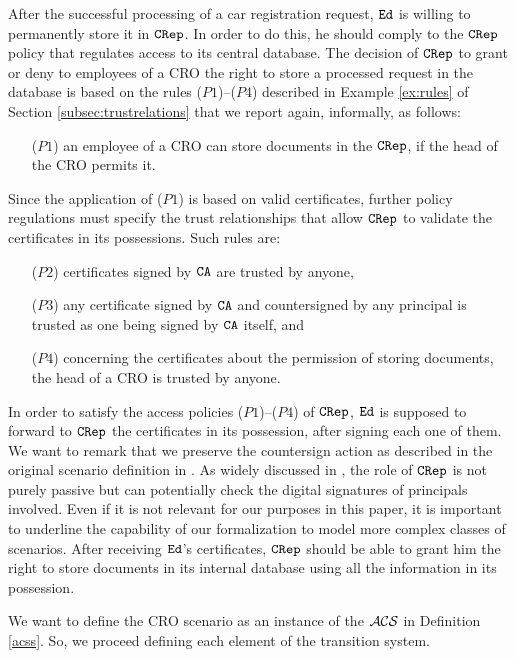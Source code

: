 \documentclass[conference]{llncs}
\newcommand{\theCA}{\ensuremath \mathtt{CA}}
\newcommand{\Ed}{\ensuremath \mathtt{Ed}}
\newcommand{\CRep}{\ensuremath \mathtt{CRep}}
\newcommand{\CRO}{CRO}
\newcommand{\acs}{\ensuremath \mathcal{ACS}}
\begin{document}
{After the successful processing of a car registration request, $\Ed$ is
willing to permanently store it in $\CRep$. In order to do this, he
should comply to the $\CRep$ policy that regulates access to its central
database. The decision of $\CRep$ to grant or deny to employees of a
\CRO{} the right to store a processed request in the database is based
on the rules ($P1$)--($P4$) described in Example \ref{ex:rules} of Section \ref{subsec:trustrelations} 
that we report again, informally, as follows: 
\begin{enumerate}
\item[($P1$)] an employee of a \CRO{} can store documents in the $\CRep$,
if the head of the \CRO{} permits it.
\end{enumerate}
Since the application of ($P1$) is based on valid certificates, further
policy regulations must specify the trust relationships that allow
$\CRep$ to validate the certificates in its possessions. Such rules are:
\begin{enumerate}
\item[($P2$)] certificates signed by $\theCA$ are trusted by anyone, 
\item[($P3$)] any certificate signed by $\theCA$ and countersigned by any
principal is trusted as one being signed by $\theCA$ itself, and 
\item[($P4$)] concerning the certificates about the permission of storing
documents, the head of a \CRO{} is trusted by anyone.
\end{enumerate}

In order to satisfy the access policies ($P1$)--($P4$) of $\CRep$, $\Ed$ is
supposed to forward to $\CRep$ the certificates 
in its possession, after signing each one of them. We want to remark that we preserve the countersign action
as described in the original scenario definition in \cite{avantssar}. As widely discussed in \cite{BRV-TR09},
the role of $\CRep$ is not purely passive but can potentially check the digital signatures of principals 
involved. Even if it is not relevant for our purposes in this paper, it is important to underline the capability of our formalization to model
more complex classes of scenarios.
After receiving $\Ed$'s certificates, $\CRep$ should be able to
grant him the right to store documents in its internal database using all the information
in its possession.






We want to define the \CRO{} scenario as an instance of the $\acs$ in Definition \ref{acss}.
So, we proceed defining each element of the transition system.

}
\end{document}
